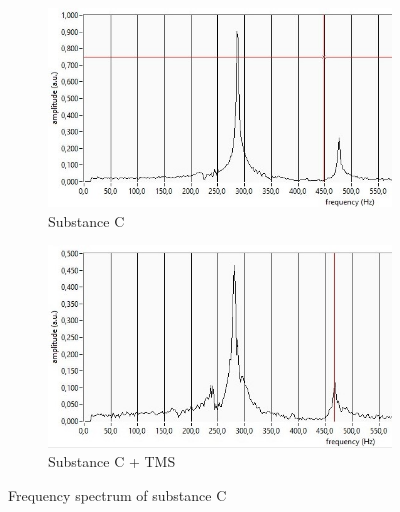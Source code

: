 \begin{figure}[!htbp]
  \centering
  \begin{subfigure}[b]{0.47\textwidth}
    \centering
    \includegraphics[width=\textwidth]{./Latex images/C.jpg}
    \caption{Substance C}
    \label{fig: C}
  \end{subfigure}
  \hfill
  \begin{subfigure}[b]{0.47\textwidth}
    \centering
    \includegraphics[width=\textwidth]{./Latex images/Cp.jpg}
    \caption{Substance C + TMS}
    \label{fig: C + TMS}
  \end{subfigure}
  \caption{Frequency spectrum of substance C}
  \label{fig:sample C}
\end{figure}

